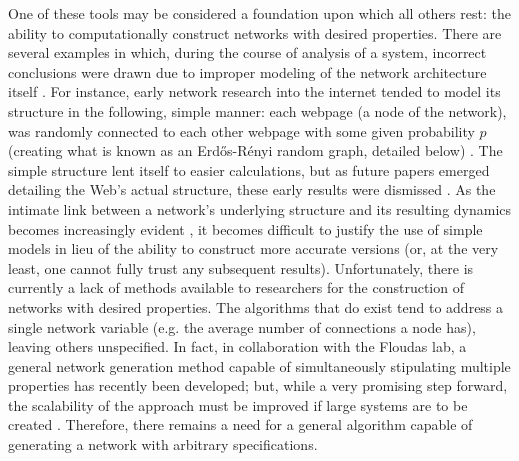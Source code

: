 \documentclass[11pt]{article}
\begin{document}
One of these tools may be considered a foundation upon which all others rest: the ability to computationally construct networks with desired properties. There are several examples in which, during the course of analysis of a system, incorrect conclusions were drawn due to improper modeling of the network architecture itself \cite{theinternetisscalefree,smallworld,etc.} \cite{Watts1998}. For instance, early network research into the internet tended to model its structure in the following, simple manner: each webpage (a node of the network), was randomly connected to each other webpage with some given probability $p$ (creating what is known as an Erd\H{o}s-R\'{e}nyi random graph, detailed below) \cite{Kumar2000}. The simple structure lent itself to easier calculations, but as future papers emerged detailing the Web's actual structure, these early results were dismissed \cite{something,hopefully}. As the intimate link between a network's underlying structure and its resulting dynamics becomes increasingly evident \cite{Barabasi1999} \cite{Barzel2013}, it becomes difficult to justify the use of simple models in lieu of the ability to construct more accurate versions (or, at the very least, one cannot fully trust any subsequent results). Unfortunately, there is currently a lack of methods available to researchers for the construction of networks with desired properties. The algorithms that do exist tend to address a single network variable (e.g. the average number of connections a node has), leaving others unspecified. In fact, in collaboration with the Floudas lab, a general network generation method capable of simultaneously stipulating multiple properties has recently been developed; but, while a very promising step forward, the scalability of the approach must be improved if large systems are to be created \cite{Gounaris2013}. Therefore, there remains a need for a general algorithm capable of generating a network with arbitrary specifications.\vspace{1mm}\\
\end{document}
